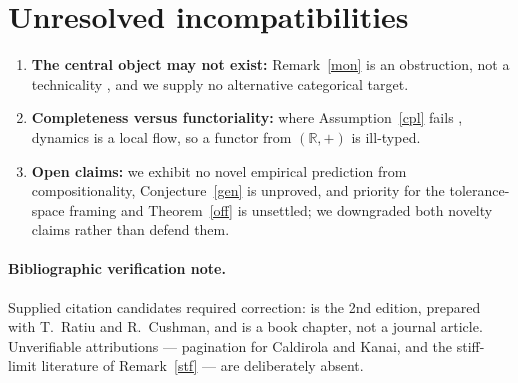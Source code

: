 \documentclass[12pt,a4paper]{article}
\theoremstyle{definition}
\theoremstyle{plain}
\theoremstyle{commentary}
\newcommand{\R}{\mathbb{R}}
\begin{document}
\section{Unresolved incompatibilities}
\label{s9}

\begin{enumerate}[leftmargin=*,itemsep=1pt,topsep=2pt]
\item \textbf{The central object may not exist:} Remark~\ref{mon} is an obstruction, not a technicality \cite{Weinstein2010}, and we supply no alternative categorical target.
\item \textbf{Completeness versus functoriality:} where Assumption~\ref{cpl} fails \cite{Xia1992}, dynamics is a local flow, so a functor from $(\R,+)$ is ill-typed.
\item \textbf{Open claims:} we exhibit no novel empirical prediction from compositionality, Conjecture~\ref{gen} is unproved, and priority for the tolerance-space framing and Theorem~\ref{off} is unsettled; we downgraded both novelty claims rather than defend them.
\end{enumerate}

\paragraph{Bibliographic verification note.}
Supplied citation candidates required correction: \cite{AbrahamMarsden1978} is the 2nd edition, prepared with T.~Ratiu and R.~Cushman, and \cite{BaezStay2011} is a book chapter, not a journal article. Unverifiable attributions --- pagination for Caldirola and Kanai, and the stiff-limit literature of Remark~\ref{stf} --- are deliberately absent.
\end{document}
